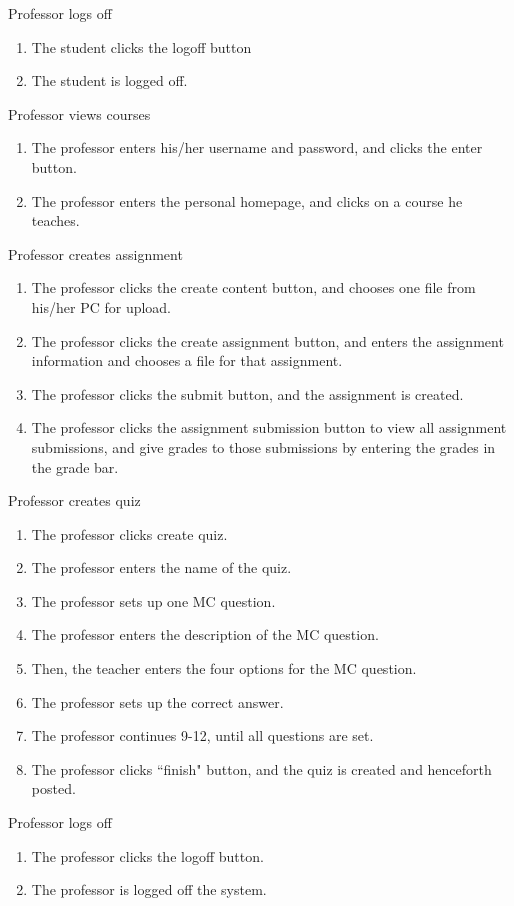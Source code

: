 \documentclass[paper=a4, fontsize=11pt]{scrartcl}
\numberwithin{equation}{section}		%
\numberwithin{figure}{section}			%
\numberwithin{table}{section}				%
\begin{document}
\begin{itemize}
\begin{enumerate}
	\end{enumerate}
	\par Professor logs off
	\begin{enumerate}
		\item The student clicks the logoff button
		\item The student is logged off.
	\end{enumerate}
	\par Professor views courses
	\begin{enumerate}
		\item The professor enters his/her username and password, and clicks the enter button.
		\item The professor enters the personal homepage, and clicks on a course he teaches.
	\end{enumerate}
	\par Professor creates assignment
	\begin{enumerate}
		\item The professor clicks the create content button, and chooses one file from his/her PC for upload.
		\item The professor clicks the create assignment button, and enters the assignment information and chooses a file for that assignment.
		\item The professor clicks the submit button, and the assignment is created.
		\item The professor clicks the assignment submission button to view all assignment submissions, and give grades to those submissions by entering the grades in the grade bar.
	\end{enumerate}
	\par Professor creates quiz
	\begin{enumerate}
		\item The professor clicks create quiz.
		\item The professor enters the name of the quiz.
		\item The professor sets up one MC question.
		\item The professor enters the description of the MC question.
		\item Then, the teacher enters the four options for the MC question.
		\item The professor sets up the correct answer.
		\item The professor continues 9-12, until all questions are set.
		\item The professor clicks ``finish" button, and the quiz is created and henceforth posted.
	\end{enumerate}
	\par Professor logs off
	\begin{enumerate}
		\item The professor clicks the logoff button.
		\item The professor is logged off the system.
	\end{enumerate}
	

\end{itemize}
\end{document}
